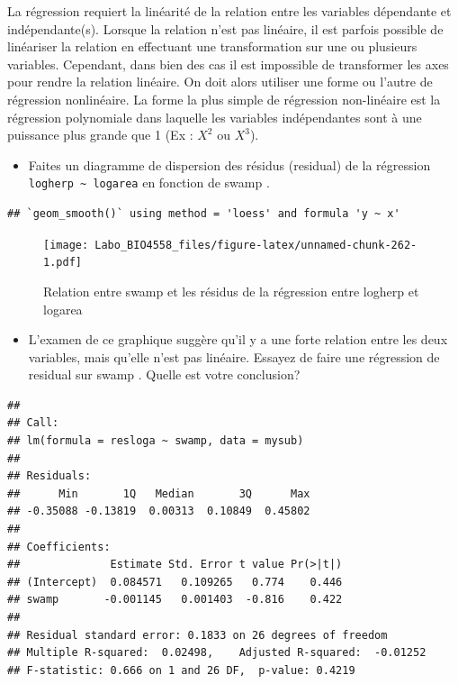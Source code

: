 \documentclass[12pt,]{book}
\providecommand{\tightlist}{%
  \setlength{\itemsep}{0pt}\setlength{\parskip}{0pt}}
\begin{document}
La régression requiert la linéarité de la relation entre les variables dépendante et indépendante(s). Lorsque la relation n'est pas linéaire, il est parfois possible de linéariser la relation en effectuant une transformation sur une ou plusieurs variables. Cependant, dans bien des cas il est impossible de transformer les axes pour rendre la relation linéaire. On doit alors utiliser une forme ou l'autre de régression nonlinéaire. La forme la plus simple de régression non-linéaire est la régression polynomiale dans laquelle les variables indépendantes sont à une puissance plus grande que 1 (Ex : \(X^2\) ou \(X^3\)).

\begin{itemize}
\tightlist
\item
  Faites un diagramme de dispersion des résidus (residual) de la régression \texttt{logherp\ \textasciitilde{}\ logarea} en fonction de swamp .
\end{itemize}

\begin{verbatim}
## `geom_smooth()` using method = 'loess' and formula 'y ~ x'
\end{verbatim}

\begin{figure}
\centering
\texttt{[image: Labo\_BIO4558\_files/figure-latex/unnamed-chunk-262-1.pdf]}
\caption{\label{fig:unnamed-chunk-262}Relation entre swamp et les résidus de la régression entre logherp et logarea}
\end{figure}

\begin{itemize}
\tightlist
\item
  L'examen de ce graphique suggère qu'il y a une forte relation entre les deux variables, mais qu'elle n'est pas linéaire. Essayez de faire une régression de residual sur swamp . Quelle est votre conclusion?
\end{itemize}

\begin{verbatim}
## 
## Call:
## lm(formula = resloga ~ swamp, data = mysub)
## 
## Residuals:
##      Min       1Q   Median       3Q      Max 
## -0.35088 -0.13819  0.00313  0.10849  0.45802 
## 
## Coefficients:
##              Estimate Std. Error t value Pr(>|t|)
## (Intercept)  0.084571   0.109265   0.774    0.446
## swamp       -0.001145   0.001403  -0.816    0.422
## 
## Residual standard error: 0.1833 on 26 degrees of freedom
## Multiple R-squared:  0.02498,    Adjusted R-squared:  -0.01252 
## F-statistic: 0.666 on 1 and 26 DF,  p-value: 0.4219
\end{verbatim}
\end{document}

